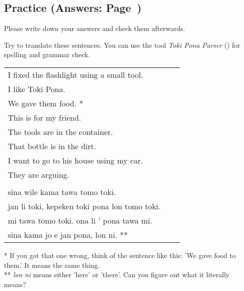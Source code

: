 \subsection*{Practice (Answers: Page~\pageref{'prepositions01'})}
%
Please write down your answers and check them afterwards. 

Try to translate these sentences. 
You can use the tool \textit{Toki Pona Parser} (\cite{www:rowa:02}) for spelling and grammar check. 

\begin{supertabular}{p{5,5cm}|ll}
I fixed the flashlight using a small tool.  &&  \\ %
I like Toki Pona.   &&   \\ %
We gave them food. * &&    \\ %
This is for my friend.   &&   \\ %
The tools are in the container.   &&   \\ %
That bottle is in the dirt.  &&    \\ %
I want to go to his house using my car.  &&   \\  %
They are arguing.   &&   \\ %
&& \\ %
sina wile kama tawa tomo toki.   &&   \\ %
jan li toki, kepeken toki pona lon tomo toki.  &&    \\ %
mi tawa tomo toki. ona li ' pona tawa mi.  &&   \\  %
sina kama jo e jan pona, lon ni. **  &&   \\ %
\end{supertabular} 

* If you got that one wrong, think of the sentence like this: 
'We gave food to them.' It means the same thing. \\
** \textit{lon ni} means either 'here' or 'there'. 
Can you figure out what it literally means? 
%
